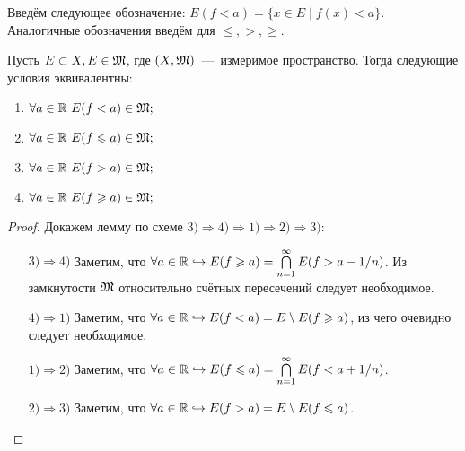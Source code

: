 \begin{remark}
    Введём следующее обозначение: $E(f < a) = \{x \in E \mid f(x) < a\}$. Аналогичные обозначения введём для $\leq, >, \geq$.
\end{remark}

\begin{lemma}
    Пусть $E \subset X, E \in \mathfrak{M}$, где $(X, \mathfrak{M})$~---~измеримое пространство. Тогда следующие условия эквивалентны:
    \begin{enumerate}
        \item $\forall a \in \mathbb{R} \  E(f < a) \in \mathfrak{M};$
        \item $\forall a \in \mathbb{R} \  E(f \leqslant a) \in \mathfrak{M};$
        \item $\forall a \in \mathbb{R} \  E(f > a) \in \mathfrak{M};$
        \item $\forall a \in \mathbb{R} \  E(f \geqslant a) \in \mathfrak{M};$
    \end{enumerate}
\end{lemma}
\begin{proof}
    Докажем лемму по схеме $3) \Rightarrow 4) \Rightarrow 1) \Rightarrow 2) \Rightarrow 3)$:
    \begin{enumerate}
        \item[$3) \Rightarrow 4)$] Заметим, что $\forall a \in \mathbb{R} \hookrightarrow E(f \geqslant a) = \bigcap\limits_{n = 1}^\infty E(f > a - 1/n)$. Из замкнутости $\mathfrak{M}$ относительно счётных пересечений следует необходимое.
        \item[$4) \Rightarrow 1)$] Заметим, что $\forall a \in \mathbb{R} \hookrightarrow E(f < a) = E \setminus E(f \geqslant a)$, из чего очевидно следует необходимое.
        \item[$1) \Rightarrow 2)$] Заметим, что $\forall a \in \mathbb{R} \hookrightarrow E(f \leqslant a) = \bigcap\limits_{n = 1}^\infty E(f < a + 1/n)$.
        \item[$2) \Rightarrow 3)$] Заметим, что $\forall a \in \mathbb{R} \hookrightarrow E(f > a) = E \setminus E(f \leqslant a)$.
    \end{enumerate}
\end{proof}

